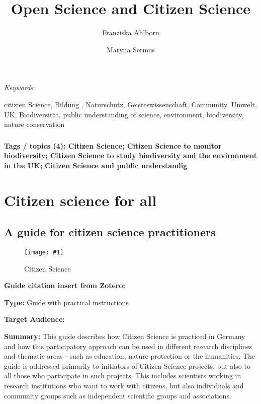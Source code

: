 \documentclass{article}
\def\keywords{\vspace{.5em}
                
{\textit{Keywords}:\,\relax%
                
}}
\newcommand{\sep}{, }
\newlength{\imgwidth}
\newcommand\scaledgraphics[2]{%
                
\settowidth{\imgwidth}{\texttt{[image: \#1]}}%
                
\setlength{\imgwidth}{\minof{\imgwidth}{#2\textwidth}}%
                
\texttt{[image: \#1]}%
                
}
\begin{document}
\title{Open Science and Citizen Science}

\maketitle

\author{Franziska Ahlborn}
\author{Maryna Sermus}
\affil{}


\keywords{citizien Science\sep Bildung \sep Naturschutz\sep Geisteswissenschaft\sep Community\sep Umwelt\sep UK\sep Biodiversität\sep public understanding of science\sep environment\sep biodiversity\sep nature conservation}

\subsubsection{}\label{H1731420}



\textbf{Tags / topics (4): Citizen Science; Citizen Science to monitor biodiversit}y\textbf{; Citizen Science to study biodiversity and the environment in the UK;} \textbf{Citizen Science and public understandig}


\section{Citizen science for all}\label{H2662301}



\subsection{A guide for citizen science practitioners}\label{H9328356}



\begin{center}
\begin{figure}
\scaledgraphics{3cbbd8ed-7495-46a8-8cb5-114cf95cfb83.png}{0.5}
\caption*{Citizen Science}\label{F38618731}
\end{figure}


\end{center}





\textbf{Guide citation insert from Zotero:} \autocite{noauthor_citizen_2016}


\textbf{Type: }Guide with practical instructions


\textbf{Target Audience:}


\textbf{Summary: }This guide describes how Citizen Science is practiced in Germany and how this participatory approach can be used in different research disciplines and thematic areas - such as education, nature protection or the humanities. The guide is addressed primarily to initiators of Citizen Science projects, but also to all those who participate in such projects. This includes scientists working in research institutions who want to work with citizens, but also individuals and community groups such as independent scientific groups and associations.
\end{document}
